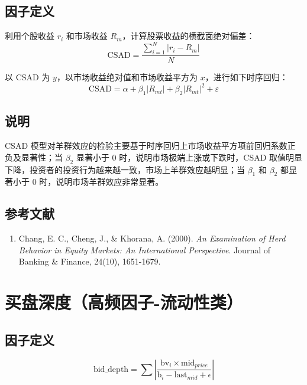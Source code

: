 \documentclass{article}
\begin{document}
\subsection{因子定义}
利用个股收益 \( r_i \) 和市场收益 \( R_m \)，计算股票收益的横截面绝对偏差：
\begin{equation}
    \mathrm{CSAD} = \frac{\sum_{i=1}^N |r_i - R_m|}{N}
\end{equation}

以 \( \mathrm{CSAD} \) 为 \( y \)，以市场收益绝对值和市场收益平方为 \( x \)，进行如下时序回归：
\begin{equation}
    \mathrm{CSAD} = \alpha + \beta_1 |R_{mt}| + \beta_2 |R_{mt}|^2 + \varepsilon
\end{equation}

\subsection{说明}
CSAD 模型对羊群效应的检验主要基于时序回归上市场收益平方项前回归系数正负及显著性；当 \( \beta_2 \) 显著小于 0 时，说明市场极端上涨或下跌时，CSAD 取值明显下降，投资者的投资行为越来越一致，市场上羊群效应越明显；当 \( \beta_1 \) 和 \( \beta_2 \) 都显著小于 0 时，说明市场羊群效应非常显著。

\subsection{参考文献}
\begin{enumerate}
    \item Chang, E. C., Cheng, J., \& Khorana, A. (2000). \textit{An Examination of Herd Behavior in Equity Markets: An International Perspective}. Journal of Banking \& Finance, 24(10), 1651-1679.
\end{enumerate}

\section{买盘深度（高频因子-流动性类）}

\subsection{因子定义}

\begin{equation}
    \mathrm{bid\_depth} = \sum \left| \frac{\mathrm{bv}_i \times \mathrm{mid}_{price}}{\mathrm{b}_i - \mathrm{last}_{mid} + \epsilon} \right|
\end{equation}
\end{document}
